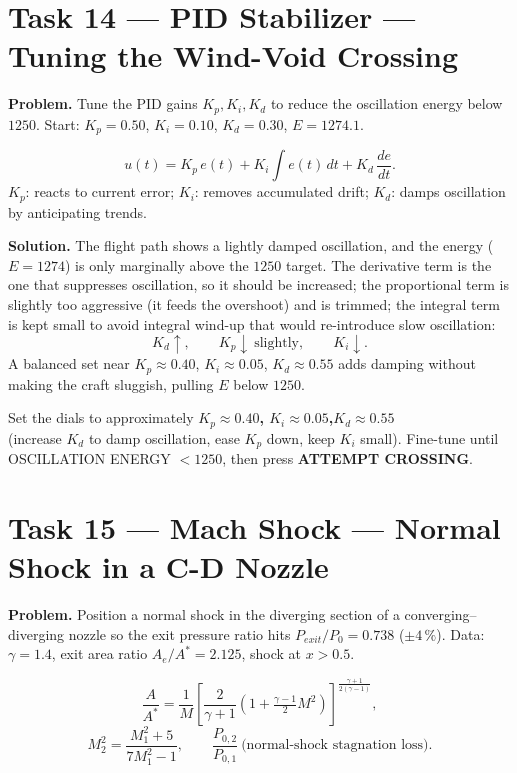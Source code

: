 \documentclass[11pt]{article}
\newcommand{\task}[2]{\section{Task #1 --- #2}}
\begin{document}
\task{14}{PID Stabilizer --- Tuning the Wind-Void Crossing}
\textbf{Problem.} Tune the PID gains $K_p,K_i,K_d$ to reduce the oscillation
energy below $1250$. Start: $K_p=0.50$, $K_i=0.10$, $K_d=0.30$, $E=1274.1$.

\begin{relbox}
\[
u(t)=K_p\,e(t)+K_i\!\int e(t)\,dt+K_d\,\frac{de}{dt}.
\]
$K_p$: reacts to current error; $K_i$: removes accumulated drift;
$K_d$: damps oscillation by anticipating trends.
\end{relbox}

\textbf{Solution.} The flight path shows a lightly damped oscillation, and the
energy ($E=1274$) is only marginally above the $1250$ target. The derivative
term is the one that suppresses oscillation, so it should be increased; the
proportional term is slightly too aggressive (it feeds the overshoot) and is
trimmed; the integral term is kept small to avoid integral wind-up that would
re-introduce slow oscillation:
\[
K_d\uparrow,\qquad K_p\downarrow\ \text{slightly},\qquad K_i\downarrow.
\]
A balanced set near $K_p\approx0.40$, $K_i\approx0.05$, $K_d\approx0.55$
adds damping without making the craft sluggish, pulling $E$ below $1250$.

\begin{answer}
Set the dials to approximately \textbf{$K_p\approx0.40$,\quad
$K_i\approx0.05$,\quad $K_d\approx0.55$}\\
(increase $K_d$ to damp oscillation, ease $K_p$ down, keep $K_i$ small).
Fine-tune until OSCILLATION ENERGY $<1250$, then press \textbf{ATTEMPT CROSSING}.
\end{answer}

\task{15}{Mach Shock --- Normal Shock in a C-D Nozzle}
\textbf{Problem.} Position a normal shock in the diverging section of a
converging--diverging nozzle so the exit pressure ratio hits
$P_{exit}/P_0=0.738$ ($\pm4\,\%$).
Data: $\gamma=1.4$, exit area ratio $A_e/A^{*}=2.125$, shock at $x>0.5$.

\begin{relbox}
\[
\frac{A}{A^{*}}=\frac{1}{M}\!\left[\frac{2}{\gamma+1}\!\left(1+\tfrac{\gamma-1}{2}M^2\right)\right]^{\frac{\gamma+1}{2(\gamma-1)}},
\]
\[
M_2^2=\frac{M_1^2+5}{7M_1^2-1},\qquad
\frac{P_{0,2}}{P_{0,1}}\ \text{(normal-shock stagnation loss)}.
\]
\end{relbox}
\end{document}
